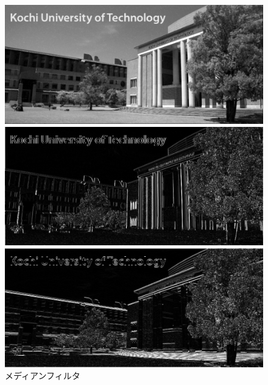 \begin{figure}[H]
\begin{minipage}[b]{.49\textwidth}
\begin{minipage}[b]{.49\textwidth}
            \subcaption{\wgnimg}
        \end{minipage}
        \begin{minipage}[b]{.49\textwidth}
            \includegraphics[keepaspectratio,width=\textwidth]{../../Figures/06_24_mf_img_in.png}
            \subcaption{\inimg}
        \end{minipage}
        \caption{メディアンフィルタ}
    \end{minipage}
    \begin{minipage}[b]{.3\textwidth}
        \centering
        \includegraphics[keepaspectratio,width=\textwidth]{../../Figures/06_31_diff-x-img.png}
    \end{minipage}
    \begin{minipage}[b]{.3\textwidth}
        \centering
        \includegraphics[keepaspectratio,width=\textwidth]{../../Figures/06_32_diff-y-img.png}

\end{minipage}
\end{figure}
